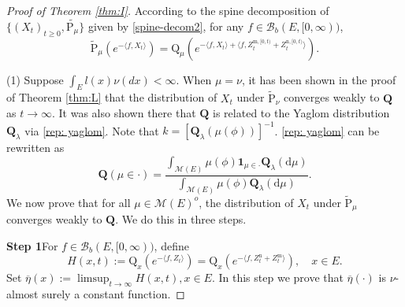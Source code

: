 \documentclass[12pt,a4paper]{amsart}
\numberwithin{equation}{section}
\theoremstyle{plain}
\theoremstyle{definition}
\theoremstyle{remark}
\begin{document}
\begin{proof}[Proof of Theorem \ref{thm:I}]
According to the spine decomposition of $\{(X_t)_{t\geq 0}, \widetilde{\mathrm P_\mu}\}$  given by
\eqref{spine-decom2}, for any
$f\in\mathcal B_b(E,[0,\infty))$,
\[
\widetilde {\mathrm P}_{\mu}\left(e^{-\langle f, X_t\rangle }\right)=\mathrm Q_{\mu}\left(e^{-\langle f, X_t\rangle+\langle f, Z^{{\mathrm m},[0,t)}_t+Z^{{\mathrm n},[0,t)}_t\rangle }\right).
\]

(1) Suppose $\int_El(x)\nu(dx)<\infty$.
When $\mu=\nu$,
it has been shown in the proof of Theorem \ref{thm:L} that the distribution of
$X_t$ under $\widetilde {\mathrm P}_{\nu}$ converges weakly to $\mathbf Q$ as $t\to\infty$.
It was also shown there that $\mathbf Q$ is related to the Yaglom distribution $\mathbf Q_\lambda$ via \eqref{rep: yaglom}.
Note that $k=[\mathbf Q_\lambda(\mu(\phi))]^{-1}$.
\eqref{rep: yaglom} can be rewritten as
\begin{equation}\label{eq size bias}
{\mathbf Q}\left(\mu\in\cdot\right)=
\dfrac{\int_{\mathcal M(E)}\mu(\phi)\mathbf 1_{\mu\in \cdot} \mathbf Q_\lambda(\mathrm d\mu)}{\int_{\mathcal M(E)}\mu(\phi)\mathbf Q_\lambda(\mathrm d\mu)}.
\end{equation}
We now prove that for all $\mu\in\mathcal M(E)^o$, the distribution of $X_t$ under $\widetilde {\mathrm P}_{\mu}$ converges weakly to $\mathbf Q$.  We do this in three steps.

{\bf Step 1}\quad For $f\in\mathcal B_b(E,[0,\infty))$, define
\begin{equation}\label{def: H}
H(x,t):={\mathrm Q}_x\left(e^{-\langle f, Z_{t}\rangle }\right)={\mathrm Q}_x\left(e^{-\langle f, Z^{\mathrm n}_{t} + Z^{\mathrm m}_{t}\rangle }\right),\quad x\in E.
\end{equation}
Set $\overline \eta(x):=\limsup_{t\to\infty}H(x,t), x\in E$.
In this step we prove that
$\overline\eta(\cdot)$ is $\nu$-almost surely a constant function.


\end{proof}
\end{document}
